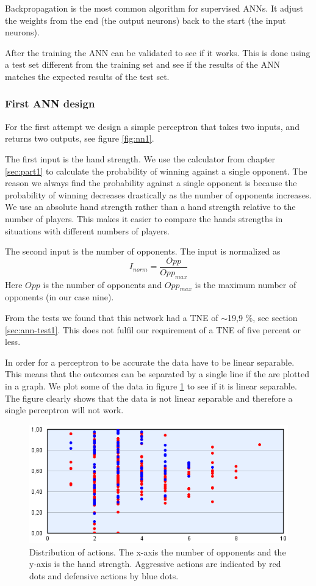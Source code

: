 Backpropagation is the most common algorithm for supervised ANNs. It adjust the weights from the end (the output neurons) back to the start (the input neurons).

After the training the ANN can be validated to see if it works. This is done using a test set different from the training set and see if the results of the ANN matches the expected results of the test set.

\subsubsection{First ANN design}
\label{sec:design1}
For the first attempt we design a simple perceptron that takes two inputs, and returns two outputs, see figure \ref{fig:nn1}. 


The first input is the hand strength. We use the calculator from chapter \ref{sec:part1} to calculate the probability of winning against a single opponent. The reason we always find the probability against a single opponent is because the probability of winning decreases drastically as the number of opponents increases. We use an absolute hand strength rather than a hand strength relative to the number of players. This makes it easier to compare the hands strengths in situations with different numbers of players. 

The second input is the number of opponents. The input is normalized as \[I_{norm} = \frac{Opp}{Opp_{max}}\] 
Here $Opp$ is the number of opponents and $Opp_{max}$ is the maximum number of opponents (in our case nine).

From the tests we found that this network had a TNE of $\sim$19,9 \%, see section \ref{sec:ann-test1}. This does not fulfil our requirement of a TNE of five percent or less.

In order for a perceptron to be accurate the data have to be linear separable. This means that the outcomes can be separated by a single line if the are plotted in a graph. We plot some of the data in figure \ref{fig:linear-separable} to see if it is linear separable. The figure clearly shows that the data is not linear separable and therefore a single perceptron will not work.

\begin{figure}[H]
  \center
    \includegraphics[scale=0.8]{images/nn/default-nn1-plot.png}
  \caption{Distribution of actions. The x-axis  the number of opponents and the y-axis is the hand strength. Aggressive actions are indicated by red dots and defensive actions by blue dots. \label{fig:linear-separable}}
\end{figure}

